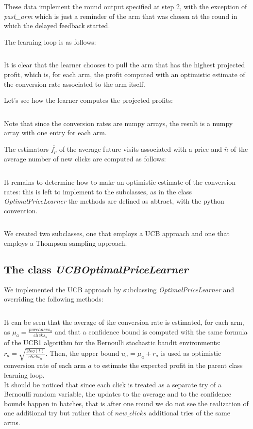 \documentclass[11pt]{article} %
\begin{document}
These data implement the round output specified at step 2, with the exception of \textit{past\_arm} which is just a reminder of the arm that was chosen at the round in which the delayed feedback started. 

The learning loop is as follows:
\inputminted{python}{code/step3_learning_loop.py}
It is clear that the learner chooses to pull the arm that has the highest projected profit, which is, for each arm, the profit computed with an optimistic estimate of the conversion rate associated to the arm itself.

Let's see how the learner computes the projected profits:
\inputminted{python}{code/step3_projected_profits.py}
Note that since the conversion rates are numpy arrays, the result is a numpy array with one entry for each arm.

The estimators $\overline{f_p}$ of the average future visits associated with a price and $\overline{n}$ of the average number of new clicks are computed as follows:
\inputminted{python}{code/step3_estimates.py}
It remains to determine how to make an optimistic estimate of the conversion rates: this is left to implement to the subclasses, as in the class \textit{OptimalPriceLearner} the methods are defined as abtract, with the python convention.
\inputminted{python}{code/step3_conversion_rates.py}
We created two subclasses, one that employs a UCB approach and one that employs a Thompson sampling approach.\\

\begin{samepage}
\subsection{The class \textit{UCBOptimalPriceLearner}}
We implemented the UCB approach by subclassing  \textit{OptimalPriceLearner} and overriding the following methods:
\inputminted{python}{code/step3_ucb.py}
\end{samepage}
It can be seen that the average of the conversion rate is estimated, for each arm, as $\mu_a=\frac{purchases_a}{clicks_a}$ and that a confidence bound is computed with the same formula of the UCB1 algorithm for the Bernoulli stochastic bandit environments: $r_a=\sqrt{\frac{2log(t)}{clicks_a}}$.
Then, the upper bound $u_a = \mu_a+r_a$ is used as optimistic conversion rate of each arm $a$ to estimate the expected profit in the parent class learning loop.\\

It should be noticed that since each click is treated as a separate try of a Bernoulli random variable, the updates to the average and to the confidence bounds happen in batches, that is after one round we do not see the realization of one additional try but rather that of $new\_clicks$ additional tries of the same arms.\\
\end{document}
